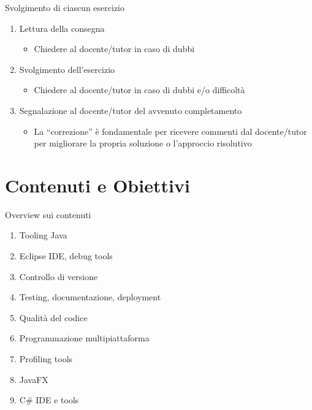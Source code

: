\documentclass[presentation]{beamer}
\begin{document}
\begin{frame}{Svolgimento di ciascun esercizio}
\begin{enumerate}\itemsep20pt
\item Lettura della consegna
\begin{itemize}
\item Chiedere al docente/tutor in caso di dubbi
\end{itemize}
\item Svolgimento dell'esercizio
\begin{itemize}
\item Chiedere al docente/tutor in caso di dubbi e/o difficoltà
\end{itemize}
\item Segnalazione al docente/tutor del avvenuto completamento
\begin{itemize}
\item La ``correzione'' è fondamentale per ricevere commenti dal docente/tutor per migliorare la propria soluzione o l'approccio risolutivo
\end{itemize}
\end{enumerate}
\end{frame}

\section{Contenuti e Obiettivi}

\begin{frame}{Overview sui contenuti}

\begin{enumerate}\itemsep10pt
\item Tooling Java
\item Eclipse IDE, debug tools
\item Controllo di versione
\item Testing, documentazione, deployment
\item Qualità del codice
\item Programmazione multipiattaforma
\item Profiling tools
\item JavaFX
\item C\# IDE e tools
\end{enumerate}

\end{frame}
\end{document}

